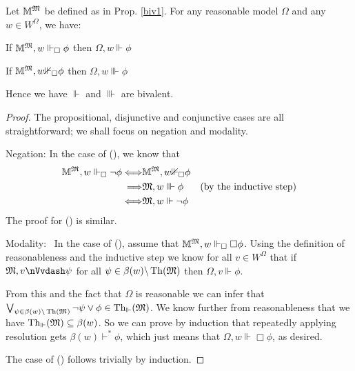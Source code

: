 \begin{proposition}
  Let $\mathbbm{M}^{\Omega}$ be defined as in Prop.  \ref{biv1}.
  For any reasonable model $\Omega$ and any $w \in W^{\Omega}$, we have:
  \begin{enumerateroman}
    \item If $\mathbbm{M}^{\Omega}, w \Vdash_{\Box} \phi$ then $\Omega, w
    \Vdash \phi$
    
    \item If $\mathbbm{M}^{\Omega}, w {\nVdash}_{\Box} \phi$ then $\Omega,
    w \Vvdash \phi$
  \end{enumerateroman}  
  Hence we have $\Vdash$ and $\Vvdash$ are bivalent.
\end{proposition}

\begin{proof}
  The propositional, disjunctive and conjunctive cases are all
  straightforward; we shall focus on negation and modality.
  
  Negation: In the case of (), we know that \
  \begin{eqnarray}
    \mathbbm{M}^{\Omega}, w \Vdash_{\Box} \neg \phi \Longleftrightarrow &
    \mathbbm{M}^{\Omega}, w {\nVdash}_{\Box} \phi &  \nonumber\\
    \Longrightarrow & \Omega, w \Vvdash \phi & \text{(by the inductive step)}
    \nonumber\\
    \Longleftrightarrow & \Omega, w \Vdash \neg \phi &  \nonumber
  \end{eqnarray}
  The proof for () is similar.
  
  Modality: \ In the case of (), assume that
  $\mathbbm{M}^{\Omega}, w \Vdash_{\Box} \Box \phi$. Using the definition of
  reasonableness and the inductive step we know for all $v \in W^{\Omega}$
  that if $\Omega, v {\nVvdash} \psi$ for all $\psi \in \beta (w)
  \backslash \tmop{Th} (\Omega)$ then $\Omega, v \Vdash \phi$.
  
  From this and the fact that $\Omega$ is reasonable we can infer that
  $\bigvee_{\psi \in \beta (w) \backslash \tmop{Th} (\Omega)} \neg \psi \vee
  \phi \in \tmop{Th}_{\Vdash} (\Omega)$.   We know further from reasonableness
  that we have $\tmop{Th}_{\Vdash} (\Omega) \subseteq \beta (w)$. So we can
  prove by induction that repeatedly applying resolution gets $\beta (w)
  \vdash^{\ast} \phi$, which just means that $\Omega, w \Vdash \Box \phi$, as
  desired.
  
  The case of () follows trivially by induction.
\end{proof}

